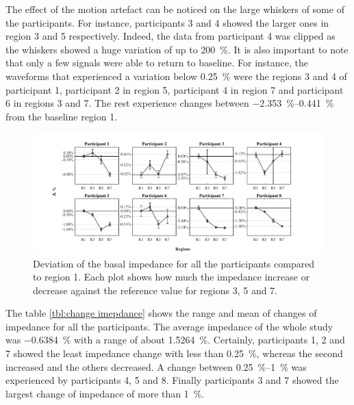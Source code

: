 The effect of the motion artefact can be noticed on the large whiskers of some of the participants. For instance, participants 3 and 4 showed the larger ones in region 3 and 5 respectively. Indeed, the data from participant 4 was clipped as the whiskers showed a huge variation of up to \SI{200}{\percent}. It is also important to note that only a few signals were able to return to baseline. For instance, the waveforms that experienced a variation below \SI{0.25}{\percent} were the regions 3 and 4 of participant 1, participant 2 in region 5, participant 4 in region 7 and participant 6 in regions 3 and 7. The rest experience changes between \SIrange{-2.353}{0.441}{\percent} from the baseline region 1. 


\begin{figure}[!t]  %
	\includegraphics[width=\textwidth,keepaspectratio, trim={2cm 0cm 3cm 0cm},clip]{figure_b_4}    
	\caption[Percentil change of baseline imepdance]{Deviation of the basal impedance for all the participants compared to region 1. Each plot shows how much the impedance increase or decrease against the reference value for regions 3, 5 and 7. }
	\label{fig:delta percent} 
\end{figure}

The table \ref{tbl:change imepdance} shows the range and mean of changes of impedance for all the participants. The average impedance of the whole study was \SI{-0.6384}{\percent} with a range of about \SI{1.5264}{\percent}. Certainly, participants 1, 2 and 7 showed the least impedance change with less than \SI{0.25}{\percent}, whereas the second increased and the others decreased.  A change between \SIrange{0.25}{1}{\percent} was experienced by participants 4, 5 and 8. Finally participants 3 and 7 showed the largest change of impedance of more than \SI{1}{\percent}. 

